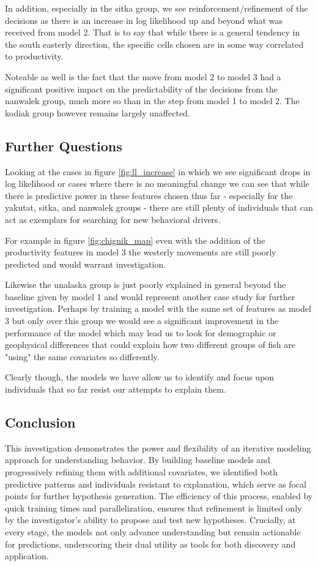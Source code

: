 \documentclass[11pt]{article}
\begin{document}
In addition, especially in the sitka group, we see reinforcement/refinement of the decisions as there is an increase in log likelihood up and beyond what was received from model 2. That is to say that while there is a general tendency in the south easterly direction, the specific cells chosen are in some way correlated to productivity. 

Noteable as well is the fact that the move from model 2 to model 3 had a significant positive impact on the predictability of the decisions from the nanwalek group, much more so than in the step from model 1 to model 2. The kodiak group however remains largely unaffected. 

\subsection*{Further Questions}

Looking at the cases in figure \ref{fig:ll_increase} in which we see significant drops in log likelihood or cases where there is no meaningful change we can see that while there is predictive power in these features chosen thus far - especially for the yakutat, sitka, and nanwalek groups - there are still plenty of individuals that can act as exemplars for searching for new behavioral drivers. 

For example in figure \ref{fig:chignik_map} even with the addition of the productivity features in model 3 the westerly movements are still poorly predicted and would warrant investigation. 

Likewise the unalaska group is just poorly explained in general beyond the baseline given by model 1 and would represent another case study for further investigation. Perhaps by training a model with the same set of features as model 3 but only over this group we would see a significant improvement in the performance of the model which may lead us to look for demographic or geophysical differences that could explain how two different groups of fish are "using" the same covariates so differently. 

Clearly though, the models we have allow us to identify and focus upon individuals that so far resist our attempts to explain them. 

\subsection*{Conclusion}

This investigation demonstrates the power and flexibility of an iterative modeling approach for understanding behavior. By building baseline models and progressively refining them with additional covariates, we identified both predictive patterns and individuals resistant to explanation, which serve as focal points for further hypothesis generation. The efficiency of this process, enabled by quick training times and parallelization, ensures that refinement is limited only by the investigator's ability to propose and test new hypotheses. Crucially, at every stage, the models not only advance understanding but remain actionable for predictions, underscoring their dual utility as tools for both discovery and application. 
\end{document}
